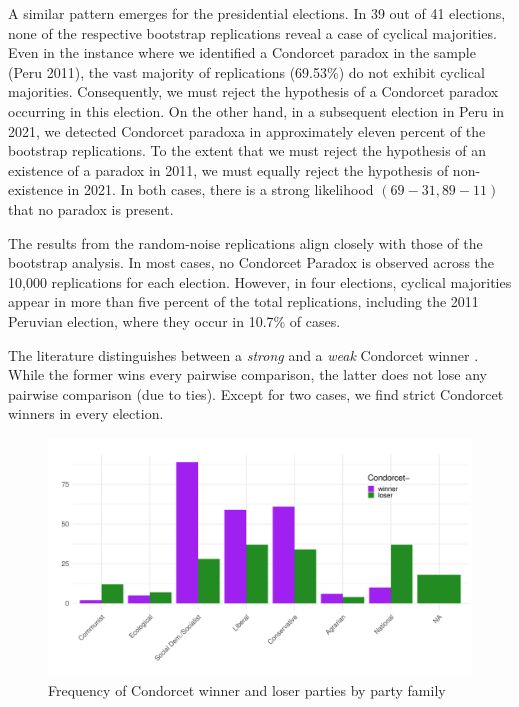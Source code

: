 \documentclass[12pt]{scrartcl}
\newcommand{\nbpresidential}{41 }
\begin{document}
A similar pattern emerges for the presidential elections. In 
39 %
out of \nbpresidential elections, none of the respective bootstrap replications reveal a case of cyclical majorities. Even in the instance where we identified a Condorcet paradox in the sample (Peru 2011), the vast majority of replications (69.53\%) do not exhibit cyclical majorities. Consequently, we must reject the hypothesis of a Condorcet paradox occurring in this election. On the other hand, in a subsequent election in Peru in 2021, we detected Condorcet paradoxa in approximately eleven percent of the bootstrap replications. To the extent that we must reject the hypothesis of an existence of a paradox in 2011, we must equally reject the hypothesis of non-existence in 2021. In both cases, there is a strong likelihood $(69-31, 89-11)$ that no paradox is present.

The results from the random-noise replications align closely with those of the bootstrap analysis. In most cases, no Condorcet Paradox is observed across the 10,000 replications for each election. However, in four elections, cyclical majorities appear in more than five percent of the total replications, including the 2011 Peruvian election, where they occur in 10.7\% of cases.


The literature distinguishes between a \textit{strong} and a \textit{weak} Condorcet winner \citep{Barbera2023}. While the former wins every pairwise comparison, the latter does not lose any pairwise comparison (due to ties). Except for two cases, we find strict Condorcet winners in every election.

\begin{figure}
	\centering
	\caption{Frequency of Condorcet winner and loser parties by party family \label{f1}}
\includegraphics[width=\linewidth]{barplotFAM}
\end{figure}
\end{document}
